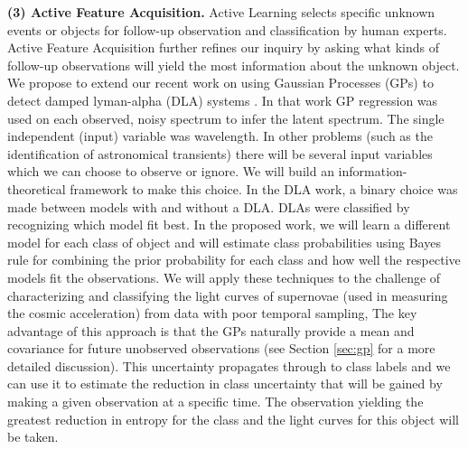 \documentclass[prd,nofootbib,floatfix,11pt,tightenlines]{revtex4}
\begin{document}
{\bf (3) Active Feature Acquisition.}  Active Learning selects specific
unknown events or objects for follow-up observation and classification
by human experts.  Active Feature Acquisition further refines our
inquiry by asking what kinds of follow-up observations will yield the
most information about the unknown object.  We propose to extend our
recent work on using Gaussian Processes (GPs) to detect damped
lyman-alpha (DLA) systems \cite{Garnett12a}.  In that work GP
regression was used on each observed, noisy spectrum to infer the
latent spectrum.  The single independent (input) variable was
wavelength.  In other problems (such as the identification of
astronomical transients) there will be several input variables which
we can choose to observe or ignore.  
We will build an information-theoretical framework to make this choice.
In the DLA work, a binary choice was made between models with and
without a DLA.  DLAs were
classified by recognizing which model fit best.  In the proposed work,
we will learn a different model for each class of object and will
estimate class probabilities using Bayes rule for combining the prior
probability for each class and how well the respective models fit the
observations.  We will apply these techniques to the challenge of
characterizing and classifying the light curves of supernovae (used in measuring the
cosmic acceleration) from data with poor temporal sampling,
The key advantage of this
approach is that the GPs naturally provide a mean and covariance for
future unobserved observations (see Section \ref{sec:gp} for a more detailed
discussion).  This uncertainty propagates through
to class labels and we can use it to estimate the reduction in class
uncertainty that will be gained by making a given observation at a
specific time.  The observation yielding the greatest reduction in
entropy for the class and the light curves for this object will be
taken.
\end{document}

